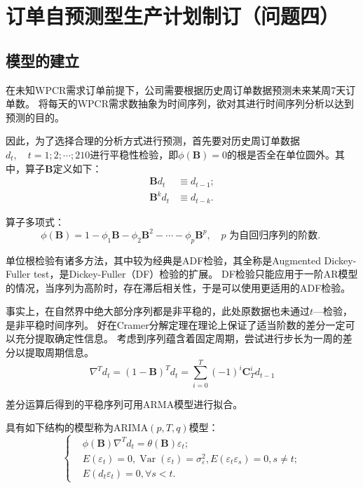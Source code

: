 \section{订单自预测型生产计划制订（问题四）} %
\label{sec:_问题四_}

\subsection{模型的建立} %
\label{sub:模型的建立}

在未知WPCR需求订单前提下，公司需要根据历史周订单数据预测未来某周7天订单数。 将每天的WPCR需求数抽象为时间序列，欲对其进行时间序列分析以达到预测的目的。

因此，为了选择合理的分析方式进行预测，首先要对历史周订单数据${d_t,\quad t=1;2;\cdots;210}$进行平稳性检验，即$\phi(\mathbf{B}) = 0$的根是否全在单位圆外。其中，算子$\mathbf{B}$定义如下：
\begin{equation}
	\begin{aligned}
\boldsymbol{B} d_{t} & \equiv d_{t-1}; \\
\boldsymbol{B}^{k} d_{t} & \equiv d_{t-k}.
\end{aligned}
\end{equation}

算子多项式：
\begin{equation}
	\phi(\boldsymbol{B})=1-\phi_{1} \boldsymbol{B}-\phi_{2} \boldsymbol{B}^{2}-\cdots-\phi_{p} \boldsymbol{B}^{p},\quad  p \text { 为自回归序列的阶数. }
\end{equation}

单位根检验有诸多方法，其中较为经典是ADF检验，其全称是Augmented Dickey-Fuller test，是Dickey-Fuller（DF）检验的扩展。 DF检验只能应用于一阶AR模型的情况，当序列为高阶时，存在滞后相关性，于是可以使用更适用的ADF检验。

事实上，在自然界中绝大部分序列都是非平稳的，此处原数据也未通过$t$—检验，是非平稳时间序列。 好在Cramer分解定理在理论上保证了适当阶数的差分一定可以充分提取确定性信息。 考虑到序列蕴含着固定周期，尝试进行步长为一周的差分以提取周期信息\cite{Python数学实验与建模}。
\begin{equation}
	\nabla^{T} d_{t}=(1-\boldsymbol{B})^{T} d_{t}=\sum_{i=0}^{T}(-1)^{i} \mathbf{C}_{T}^{i} d_{t-1}
\end{equation}

差分运算后得到的平稳序列可用ARMA模型进行拟合。

具有如下结构的模型称为ARIMA$(p, T , q)$模型：
\begin{equation}
	\left\{\begin{array}{cl}
& \phi(\boldsymbol{B}) \nabla^{T} d_{t}=\theta(\boldsymbol{B}) \varepsilon_{t}; \\
&E\left(\varepsilon_{t}\right)=0, \operatorname{Var}\left(\varepsilon_{t}\right)=\sigma_{\varepsilon}^{2}, E\left(\varepsilon_{t} \varepsilon_{s}\right)=0, s \neq t; \\
& E\left(d_{t} \varepsilon_{t}\right)=0, \forall s<t.
\end{array}\right.
\end{equation}

